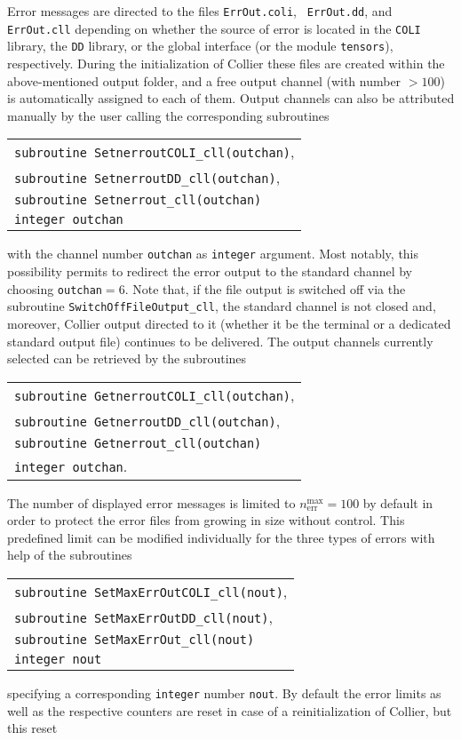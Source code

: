 \documentclass[preprint,sort&compress,12pt]{elsarticle}
\makeatletter
\def\bce{\begin{center}}
\def\ece{\end{center}}
\newcommand{\collier}{{\sc Collier}}
\newlength{\parwidth}\newlength{\colonewidth}%
\newcommand{\cpcsub}[1]
{%
\setlength{\parwidth}{\textwidth}\addtolength{\parwidth}{-2.1em}%
\bce
\begin{tabular}[t]{@{}p{\parwidth}@{}}
#1
\end{tabular}
\ece
}%
\makeatother
\begin{document}
Error messages are directed to the files {\tt ErrOut.coli}, {\tt
  ErrOut.dd}, and {\tt ErrOut.cll} depending on whether the source of
error is located in the {\tt COLI} library, the {\tt DD} library, or
the global interface (or the module {\tt tensors}), respectively.
During the initialization of {\collier} these files are created
within the above-mentioned output folder,
and a free output channel (with number $>100$) is automatically assigned to
each of them. Output channels can also be attributed manually by the user calling the corresponding subroutines
\cpcsub{
{\tt subroutine  SetnerroutCOLI\_cll(outchan)}\;,\\
{\tt subroutine  SetnerroutDD\_cll(outchan)}\;,\\
{\tt subroutine  Setnerrout\_cll(outchan)}\\
{\tt integer outchan} \\
}
with the channel number {\tt outchan} as {\tt integer} argument. Most notably, this possibility permits to redirect the error output to the standard channel
by choosing {\tt outchan${=}6$}. Note that, if the file output is switched off via the subroutine
{\tt SwitchOffFileOutput\_cll}, the standard channel is not closed and, moreover, {\collier} output directed to it (whether it be the terminal or
a dedicated standard output file) continues to be delivered. The output channels currently selected can be retrieved by the subroutines
\cpcsub{
{\tt subroutine  GetnerroutCOLI\_cll(outchan)}\;,\\
{\tt subroutine  GetnerroutDD\_cll(outchan)}\;,\\
{\tt subroutine  Getnerrout\_cll(outchan)}\\
{\tt integer outchan}\;. \\
}
The number of displayed error messages is limited to $n_{\textrm{err}}^{\textrm{max}}=100$ by default in order to protect the error files from
growing in size without control. This predefined limit can be modified individually for the three types of errors with help of the subroutines
\cpcsub{
{\tt subroutine  SetMaxErrOutCOLI\_cll(nout)}\;,\\
{\tt subroutine  SetMaxErrOutDD\_cll(nout)}\;,\\
{\tt subroutine  SetMaxErrOut\_cll(nout)}\\
{\tt integer nout} \\
}
specifying a corresponding {\tt integer} number {\tt nout}. By default
the error limits as well as the respective counters 
are reset in case of a reinitialization of {\collier}, but this reset
\end{document}
